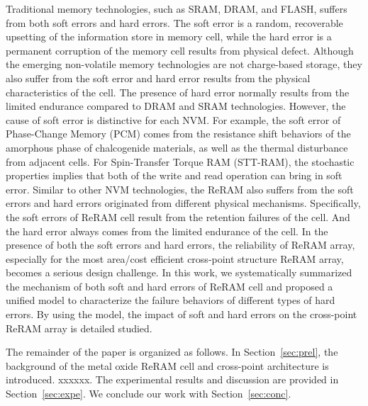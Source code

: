 Traditional memory technologies, such as SRAM, DRAM, and FLASH, suffers from both soft errors and hard errors. The soft error is a random, recoverable upsetting of the information store in memory cell, while the hard error is a permanent corruption of the memory cell results from physical defect. Although the emerging non-volatile memory technologies are not charge-based storage, they also suffer from the soft error and hard error results from the physical characteristics of the cell. The presence of hard error normally results from the limited endurance compared to DRAM and SRAM technologies. However, the cause of soft error is distinctive for each NVM. For example, the soft error of Phase-Change Memory (PCM) comes from the resistance shift behaviors of the amorphous phase of chalcogenide materials, as well as the thermal disturbance from adjacent cells. For Spin-Transfer Torque RAM (STT-RAM), the stochastic properties implies that both of the write and read operation can bring in soft error. Similar to other NVM technologies, the ReRAM also suffers from the soft errors and hard errors originated from different physical mechanisms. Specifically, the soft errors of ReRAM cell result from the retention failures of the cell. And the hard error always comes from the limited endurance of the cell. In the presence of both the soft errors and hard errors, the reliability of ReRAM array, especially for the most area/cost efficient cross-point structure ReRAM array, becomes a serious design challenge. In this work, we systematically summarized the mechanism of both soft and hard errors of ReRAM cell and proposed a unified model to characterize the failure behaviors of different types of hard errors. By using the model, the impact of soft and hard errors on the cross-point ReRAM array is detailed studied.



The remainder of the paper is organized as follows. In Section~\ref{sec:prel}, the background of the metal oxide ReRAM cell and cross-point architecture is introduced. xxxxxx. The experimental results and discussion are provided in Section~\ref{sec:expe}. We conclude our work with Section~\ref{sec:conc}. 